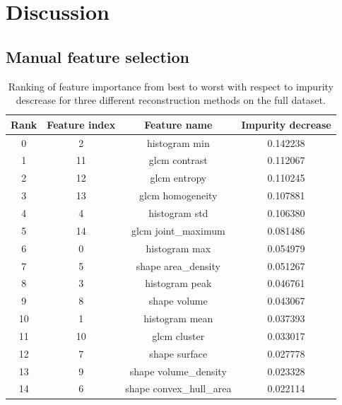 \section{Discussion}

\subsection{Manual feature selection}


\begin{table}
    \centering
    \caption{Ranking of feature importance from best to worst with respect to
    impurity descrease for three different reconstruction methods on the full
    dataset. }  
    \label{tab:feature_importance}  

    \begin{tabular}{|c|c|c|c|}
        \hline
        Rank & Feature index & Feature name & Impurity decrease \\     
        \hline
        0       & 2           & histogram min  & 0.142238   \\
        1      & 11           & glcm contrast  & 0.112067   \\
        2      & 12            & glcm entropy  & 0.110245   \\
        3      & 13        & glcm homogeneity  & 0.107881   \\
        4       & 4           & histogram std  & 0.106380   \\
        5      & 14      & glcm joint\_maximum  & 0.081486   \\
        6       & 0           & histogram max  & 0.054979   \\
        7       & 5      & shape area\_density  & 0.051267   \\
        8       & 3          & histogram peak  & 0.046761   \\
        9       & 8            & shape volume  & 0.043067   \\
        10      & 1          & histogram mean  & 0.037393   \\
        11     & 10            & glcm cluster  & 0.033017   \\
        12      & 7           & shape surface  & 0.027778   \\
        13      & 9    & shape volume\_density  & 0.023328   \\
        14      & 6  & shape convex\_hull\_area  & 0.022114   \\
        \hline
         
    \end{tabular} 
\end{table}


